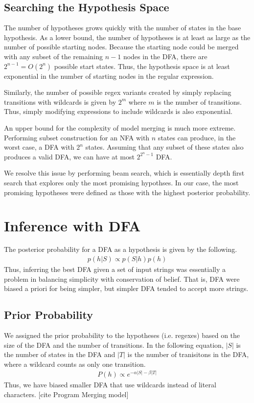 \documentclass[10pt,letterpaper]{article}
\begin{document}
\subsection{Searching the Hypothesis Space} The number of hypotheses grows quickly with the number of states in the base hypothesis. As a lower bound, the number of hypotheses is at least as large as the number of possible starting nodes. Because the starting node could be merged with any subset of the remaining $n-1$ nodes in the DFA, there are $2^{n-1}=O(2^n)$ possible start states. Thus, the hypothesis space is at least exponential in the number of starting nodes in the regular expression.

Similarly, the number of possible regex variants created by simply replacing transitions with wildcards is given by $2^m$ where $m$ is the number of transitions. Thus, simply modifying expressions to include wildcards is also exponential.

An upper bound for the complexity of model merging is much more extreme. Performing subset construction for an NFA with $n$ states can produce, in the worst case, a DFA with $2^n$ states. Assuming that any subset of these states also produces a valid DFA, we can have at most $2^{2^n-1}$ DFA.

We resolve this issue by performing beam search, which is essentially depth first search that explores only the most promising hypothses. In our case, the most promising hypotheses were defined as those with the highest posterior probability. 

\section{Inference with DFA}
The posterior probability for a DFA as a hypothesis is given by the following.
\begin{align*}
	p(h|S) \propto p(S|h)p(h)
\end{align*}
Thus, inferring the best DFA given a set of input strings was essentially a problem in balancing simplicity with conservation of belief. That is, DFA were biased a priori for being simpler, but simpler DFA tended to accept more strings.

\subsection{Prior Probability}
We assigned the prior probability to the hypotheses (i.e. regexes) based on the size of the DFA and the number of transitions. In the following equation, $|S|$ is the number of states in the DFA and $|T|$ is the number of tranisitons in the DFA, where a wildcard counts as only one transition. 
\begin{align*}
	P(h) \propto e^{-\alpha|S| - \beta|T|}
\end{align*}
Thus, we have biased smaller DFA that use wildcards instead of literal characters. [cite Program Merging model]
\end{document}
